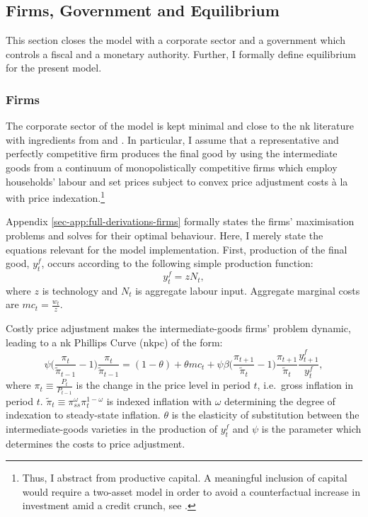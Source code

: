 \documentclass[a4paper,12pt]{article} %
\numberwithin{equation}{section} %
\numberwithin{figure}{section}
\numberwithin{table}{section}
\begin{document}
\subsection{Firms, Government and Equilibrium}
\label{sec:model-sectors}

This section closes the model with a corporate sector and a government which controls a fiscal and a monetary authority. Further, I formally define equilibrium for the present model.

\subsubsection{Firms}
\label{sec:model-firms}

The corporate sector of the model is kept minimal and close to the \Gls{nk} literature with ingredients from \textcite{mckay2016} and \textcite{gust2017wp}. In particular, I assume that a representative and perfectly competitive firm produces the final good by using the intermediate goods from a continuum of monopolistically competitive firms which employ households' labour and set prices subject to convex price adjustment costs à la \textcite{rotemberg1982} with price indexation.\footnote{Thus, I abstract from productive capital. A meaningful inclusion of capital would require a two-asset model in order to avoid a counterfactual increase in investment amid a credit crunch, see \textcite{kv2018}.}

Appendix \ref{sec-app:full-derivations-firms} formally states the firms' maximisation problems and solves for their optimal behaviour. Here, I merely state the equations relevant for the model implementation. First, production of the final good, $y_t^f$, occurs according to the following simple production function:
\begin{equation}
    y_t^f = z N_t, \label{eq:firms-production}
\end{equation}
where $z$ is technology and $N_t$ is aggregate labour input. Aggregate marginal costs are $mc_t = \frac{w_t}{z}$. 

Costly price adjustment makes the intermediate-goods firms' problem dynamic, leading to a \Gls{nk} Phillips Curve (\Gls{nkpc}) of the form:
\begin{equation}
    \psi \Bigg( \frac{\pi_t}{\tilde{\pi}_{t-1}} - 1 \Bigg) \frac{\pi_t}{\tilde{\pi}_{t-1}} = (1-\theta) + \theta mc_t + \psi \beta \Bigg( \frac{\pi_{t+1}}{\tilde{\pi}_{t}} - 1 \Bigg) \frac{\pi_{t+1}}{\tilde{\pi}_{t}} \frac{y_{t+1}^f}{y_t^f}, \label{eq:firms-nkpc}
\end{equation}
where $\pi_t \equiv \frac{P_t}{P_{t-1}}$ is the change in the price level in period $t$, i.e.~gross inflation in period $t$. $\tilde{\pi}_t \equiv \pi_{ss}^{\omega} \pi_{t}^{1-\omega}$ is indexed inflation with $\omega$ determining the degree of indexation to steady-state inflation. $\theta$ is the elasticity of substitution between the intermediate-goods varieties in the production of $y_t^f$ and $\psi$ is the parameter which determines the costs to price adjustment.  
\end{document}
